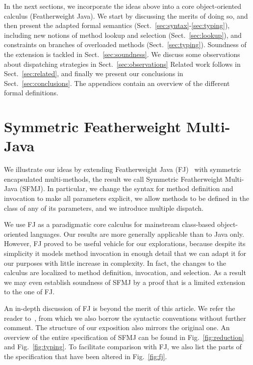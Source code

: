 \documentclass[11pt]{article}
\begin{document}
In the next sections, we incorporate the ideas above into a core object-oriented calculus (Featherweight Java). We start by discussing the merits of doing so, and then present the adapted formal semantics (Sect.~\ref{sec:syntax}-\ref{sec:typing}), including new notions of method lookup and selection (Sect.~\ref{sec:lookup}), and constraints on branches of overloaded methods (Sect.~\ref{sec:typing}). Soundness of the extension is tackled in Sect.~\ref{sec:soundness}. We discuss some observations about dispatching strategies in Sect.~\ref{sec:observations} Related work follows in Sect.~\ref{sec:related}, and finally we present our conclusions in Sect.~\ref{sec:conclusions}. The appendices contain an overview of the different formal definitions.


\section{Symmetric Featherweight Multi-Java}
\label{sec:sfmj}

We illustrate our ideas by extending Featherweight Java (FJ)~\cite{fjtoplas01} with symmetric encapsulated multi-methods, the result we call Symmetric Featherweight Multi-Java (SFMJ). In particular,  we change the syntax for method definition and invocation to make all parameters explicit,  we allow methods to be defined in the class of any of its parameters, and  we introduce multiple dispatch.

We use FJ as a paradigmatic core calculus for mainstream class-based object-oriented languages. Our results are more generally applicable than to Java only. However, FJ proved to be useful vehicle for our explorations, because despite its simplicity it models method invocation in enough detail that we can adapt it for our purposes with little increase in complexity. In fact, the changes to the calculus are localized to method definition, invocation, and selection. As a result we may even establish soundness of SFMJ by a proof that is a limited extension to the one of FJ.

An in-depth discussion of FJ is beyond the merit of this article. We refer the reader to~\cite{fjtoplas01}, from which we also borrow the syntactic conventions without further comment. The structure of our exposition also mirrors the original one. An overview of the entire specification of SFMJ can be found in Fig.~\ref{fig:reduction} and Fig.~\ref{fig:typing}. To facilitate comparison with FJ, we also list the parts of the specification that have been altered in Fig.~\ref{fig:fj}.
\end{document}
